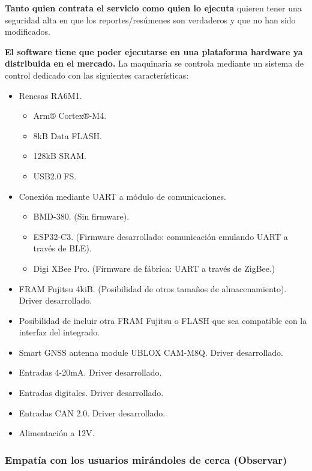 \textbf{Tanto quien contrata el servicio como quien lo ejecuta} quieren tener una seguridad alta
en que los reportes/resúmenes son verdaderos y que no han sido modificados.

\textbf{El software tiene que poder ejecutarse en una plataforma hardware ya distribuida en el mercado.}
La maquinaria se controla mediante un sistema de control dedicado con las siguientes características:

\begin{itemize}
   \item Renesas RA6M1.
   \begin{itemize}
      \item Arm® Cortex®-M4.
      \item 8kB Data FLASH.
      \item 128kB SRAM.
      \item USB2.0 FS.
   \end{itemize}
   \item Conexión mediante UART a módulo de comunicaciones.
   \begin{itemize}
      \item BMD-380. (Sin firmware).
      \item ESP32-C3. (Firmware desarrollado: comunicación emulando UART a través de
      BLE).
      \item Digi XBee Pro. (Firmware de fábrica: UART a través de ZigBee.)
   \end{itemize}
   \item FRAM Fujitsu 4kiB. (Posibilidad de otros tamaños de almacenamiento). Driver
   desarrollado.
   \item Posibilidad de incluir otra FRAM Fujitsu o FLASH que sea compatible con la
   interfaz del integrado.
   \item Smart GNSS antenna module UBLOX CAM-M8Q. Driver desarrollado.
   \item Entradas 4-20mA. Driver desarrollado.
   \item Entradas digitales. Driver desarrollado.
   \item Entradas CAN 2.0. Driver desarrollado.
   \item Alimentación a 12V.
\end{itemize}

\subsubsection{Empatía con los usuarios mirándoles de cerca (Observar)}

